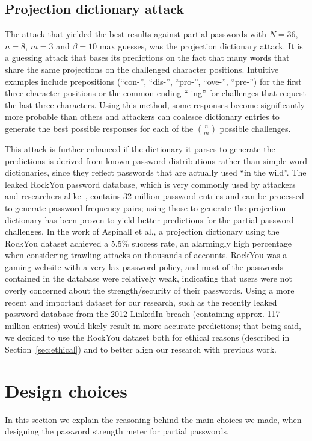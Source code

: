   \subsection{Projection dictionary attack}
    \label{ssec:projection_dictionary_attack}
    The attack that yielded the best results against partial passwords with $N = 36$, $n = 8$, $m = 3$ and $\beta = 10$ max guesses, was the projection dictionary attack. It is a guessing attack that bases its predictions on the fact that many words that share the same projections on the challenged character positions. Intuitive examples include prepositions (``con-'', ``dis-'', ``pro-'', ``ove-'', ``pre-'') for the first three character positions or the common ending ``-ing'' for challenges that request the last three characters. Using this method, some responses become significantly more probable than others and attackers can coalesce dictionary entries to generate the best possible responses for each of the {\Large $\binom{n}{m}$} possible challenges.

    This attack is further enhanced if the dictionary it parses to generate the predictions is derived from known password distributions rather than simple word dictionaries, since they reflect passwords that are actually used ``in the wild''. The leaked RockYou password database, which is very commonly used by attackers and researchers alike~\cite{pass_strength_empirical,pass_strength,NIST_invalid,rockyou1}, contains 32 million password entries and can be processed to generate password-frequency pairs; using those to generate the projection dictionary has been proven to yield better predictions for the partial password challenges. In the work of Aspinall et al., a projection dictionary using the RockYou dataset achieved a 5.5\% success rate, an alarmingly high percentage when considering trawling attacks on thousands of accounts. RockYou was a gaming website with a very lax password policy, and most of the passwords contained in the database were relatively weak, indicating that users were not overly concerned about the strength/security of their passwords. Using a more recent and important dataset for our research, such as the recently leaked password database from the 2012 LinkedIn breach (containing approx. 117 million entries)\cite{linkedin_dump} would likely result in more accurate predictions; that being said, we decided to use the RockYou dataset both for ethical reasons (described in Section~\ref{sec:ethical}) and to better align our research with previous work.


\section{Design choices}
  \label{sec:design_choices}
  In this section we explain the reasoning behind the main choices we made, when designing the password strength meter for partial passwords.

